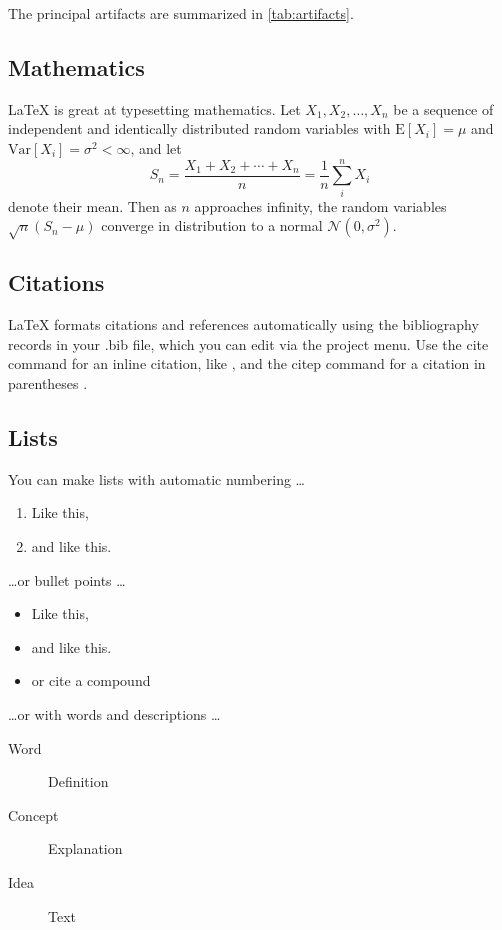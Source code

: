 \documentclass[
  blockchain,
  computerscience,
  chemistry,
  biochemistry,
  biology
]{genesisl1-paper}
\begin{document}
The principal artifacts are summarized in \cref{tab:artifacts}.

\subsection*{Mathematics}

\LaTeX{} is great at typesetting mathematics. Let $X_1, X_2, \ldots, X_n$ be a sequence of independent and identically distributed random variables with $\text{E}[X_i] = \mu$ and $\text{Var}[X_i] = \sigma^2 < \infty$, and let
$$S_n = \frac{X_1 + X_2 + \cdots + X_n}{n}
      = \frac{1}{n}\sum_{i}^{n} X_i$$
denote their mean. Then as $n$ approaches infinity, the random variables $\sqrt{n}(S_n - \mu)$ converge in distribution to a normal $\mathcal{N}(0, \sigma^2)$.

\subsection*{Citations}

LaTeX formats citations and references automatically using the bibliography records in your .bib file, which you can edit via the project menu. Use the cite command for an inline citation, like \cite{genesisl1templates2026}, and the citep command for a citation in parentheses \citep{genesisl1whitepaper2026}.

\subsection*{Lists}

You can make lists with automatic numbering \dots

\begin{enumerate}[noitemsep] 
\item Like this,
\item and like this.
\end{enumerate}
\dots or bullet points \dots
\begin{itemize}[noitemsep] 
\item Like this,
\item and like this.
\item or cite a compound  
\end{itemize}
\dots or with words and descriptions \dots
\begin{description}
\item[Word] Definition
\item[Concept] Explanation
\item[Idea] Text
\end{description}
\end{document}
